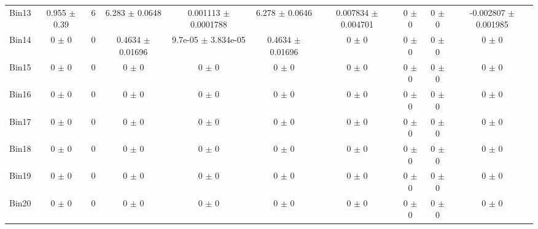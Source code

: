 \begin{tabular}{@{\extracolsep{4pt}}lccccccccc@{}}
     Bin13 & 0.955 $\pm$ 0.39 & 6 & 6.283 $\pm$ 0.0648 & 0.001113 $\pm$ 0.0001788 & 6.278 $\pm$ 0.0646 & 0.007834 $\pm$ 0.004701 & 0 $\pm$ 0 & 0 $\pm$ 0 & -0.002807 $\pm$ 0.001985 \\ 
     Bin14 & 0 $\pm$ 0 & 0 & 0.4634 $\pm$ 0.01696 & 9.7e-05 $\pm$ 3.834e-05 & 0.4634 $\pm$ 0.01696 & 0 $\pm$ 0 & 0 $\pm$ 0 & 0 $\pm$ 0 & 0 $\pm$ 0 \\ 
     Bin15 & 0 $\pm$ 0 & 0 & 0 $\pm$ 0 & 0 $\pm$ 0 & 0 $\pm$ 0 & 0 $\pm$ 0 & 0 $\pm$ 0 & 0 $\pm$ 0 & 0 $\pm$ 0 \\ 
     Bin16 & 0 $\pm$ 0 & 0 & 0 $\pm$ 0 & 0 $\pm$ 0 & 0 $\pm$ 0 & 0 $\pm$ 0 & 0 $\pm$ 0 & 0 $\pm$ 0 & 0 $\pm$ 0 \\ 
     Bin17 & 0 $\pm$ 0 & 0 & 0 $\pm$ 0 & 0 $\pm$ 0 & 0 $\pm$ 0 & 0 $\pm$ 0 & 0 $\pm$ 0 & 0 $\pm$ 0 & 0 $\pm$ 0 \\ 
     Bin18 & 0 $\pm$ 0 & 0 & 0 $\pm$ 0 & 0 $\pm$ 0 & 0 $\pm$ 0 & 0 $\pm$ 0 & 0 $\pm$ 0 & 0 $\pm$ 0 & 0 $\pm$ 0 \\ 
     Bin19 & 0 $\pm$ 0 & 0 & 0 $\pm$ 0 & 0 $\pm$ 0 & 0 $\pm$ 0 & 0 $\pm$ 0 & 0 $\pm$ 0 & 0 $\pm$ 0 & 0 $\pm$ 0 \\ 
     Bin20 & 0 $\pm$ 0 & 0 & 0 $\pm$ 0 & 0 $\pm$ 0 & 0 $\pm$ 0 & 0 $\pm$ 0 & 0 $\pm$ 0 & 0 $\pm$ 0 & 0 $\pm$ 0 \\ 
\hline\hline
  \end{tabular}
